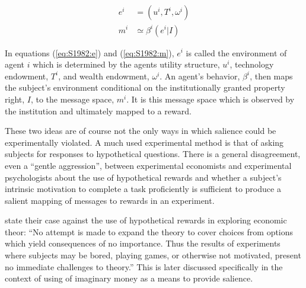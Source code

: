 \documentclass[../main.tex]{subfiles}
\begin{document}
\begin{align}
	e^i &= (u^i, T^i, \omega^i)\label{eq:S1982:e}\\
	m^i &\simeq \beta^i(e^i|I)\label{eq:S1982:m}
\end{align}

In equations (\ref{eq:S1982:e}) and (\ref{eq:S1982:m}), $e^i$ is called the environment of agent $i$ which is determined by the agents utility structure, $u^i$, technology endowment, $T^i$, and wealth endowment, $\omega^i$.
An agent's behavior, $\beta^i$, then maps the subject's environment conditional on the institutionally granted property right, $I$, to the message space, $m^i$.
It is this message space which is observed by the institution and ultimately mapped to a reward.

These two ideas are of course not the only ways in which salience could be experimentally violated.
A much used experimental method is that of asking subjects for responses to hypothetical questions.
There is a general disagreement, even a \enquote{gentle aggression}{\footnotemark}, between experimental economists and experimental psychologists about the use of hypothetical rewards and whether a subject's intrinsic motivation to complete a task proficiently is sufficient to produce a salient mapping of messages to  rewards in an experiment.
\addtocounter{footnote}{-1}

\textcite[624]{Grether1979} state their case against the use of hypothetical rewards in exploring economic theor:
\enquote{No attempt is made to expand the theory to cover choices from options which yield consequences of no importance.\textelp{} Thus the results of experiments where subjects may be bored, playing games, or otherwise not motivated, present no immediate challenges to theory.} 
This is later discussed specifically in the context of using of imaginary money as a means to provide salience.
\end{document}
